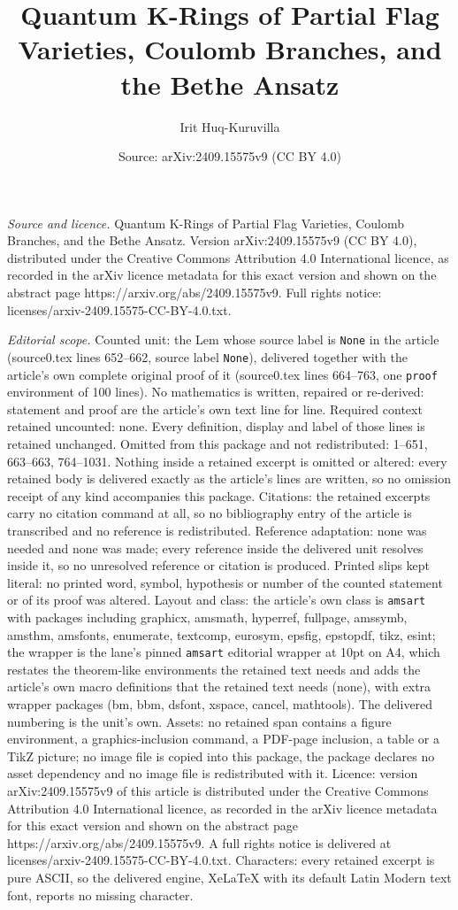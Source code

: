 \documentclass[10pt,a4paper]{amsart}
\title[Quantum K-Rings of Partial Flag Varieties, Coulomb Branches,]{Quantum K-Rings of Partial Flag Varieties, Coulomb Branches, and the Bethe Ansatz}
\author{Irit Huq-Kuruvilla}
\date{Source: arXiv:2409.15575v9 (CC BY 4.0)}
\begin{document}
\maketitle

\noindent\emph{Source and licence.} Quantum K-Rings of Partial Flag Varieties, Coulomb Branches, and the Bethe Ansatz. Version arXiv:2409.15575v9 (CC BY 4.0), distributed under the Creative Commons Attribution 4.0 International licence, as recorded in the arXiv licence metadata for this exact version and shown on the abstract page https://arxiv.org/abs/2409.15575v9. Full rights notice: licenses/arxiv-2409.15575-CC-BY-4.0.txt.\par\smallskip

\noindent\textit{Editorial scope.} Counted unit: the Lem whose source label is \texttt{None} in the article (source0.tex lines 652--662, source label \texttt{None}), delivered together with the article's own complete original proof of it (source0.tex lines 664--763, one \texttt{proof} environment of 100 lines). No mathematics is written, repaired or re-derived: statement and proof are the article's own text line for line. Required context retained uncounted: none. Every definition, display and label of those lines is retained unchanged. Omitted from this package and not redistributed: 1--651, 663--663, 764--1031. Nothing inside a retained excerpt is omitted or altered: every retained body is delivered exactly as the article's lines are written, so no omission receipt of any kind accompanies this package. Citations: the retained excerpts carry no citation command at all, so no bibliography entry of the article is transcribed and no reference is redistributed. Reference adaptation: none was needed and none was made; every reference inside the delivered unit resolves inside it, so no unresolved reference or citation is produced. Printed slips kept literal: no printed word, symbol, hypothesis or number of the counted statement or of its proof was altered. Layout and class: the article's own class is \texttt{amsart} with packages including graphicx, amsmath, hyperref, fullpage, amssymb, amsthm, amsfonts, enumerate, textcomp, eurosym, epsfig, epstopdf, tikz, esint; the wrapper is the lane's pinned \texttt{amsart} editorial wrapper at 10pt on A4, which restates the theorem-like environments the retained text needs and adds the article's own macro definitions that the retained text needs (none), with extra wrapper packages (bm, bbm, dsfont, xspace, cancel, mathtools). The delivered numbering is the unit's own. Assets: no retained span contains a figure environment, a graphics-inclusion command, a PDF-page inclusion, a table or a TikZ picture; no image file is copied into this package, the package declares no asset dependency and no image file is redistributed with it. Licence: version arXiv:2409.15575v9 of this article is distributed under the Creative Commons Attribution 4.0 International licence, as recorded in the arXiv licence metadata for this exact version and shown on the abstract page https://arxiv.org/abs/2409.15575v9. A full rights notice is delivered at licenses/arxiv-2409.15575-CC-BY-4.0.txt. Characters: every retained excerpt is pure ASCII, so the delivered engine, XeLaTeX with its default Latin Modern text font, reports no missing character.
\end{document}
